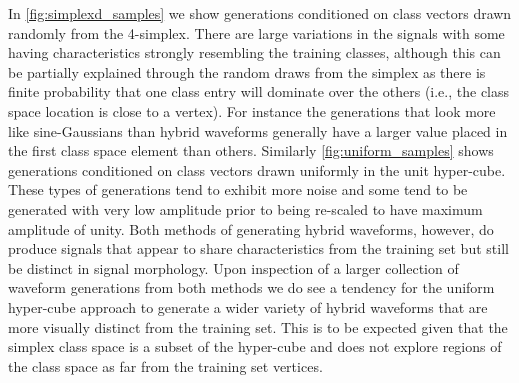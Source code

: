 \documentclass[12pt]{iopart}
\newcommand{\chris}[1]{\textbf{\textcolor{green}{CHRIS: #1}}}
\newcommand{\michael}[1]{\textbf{\textcolor{orange}{MICHAEL: #1}}}
\begin{document}
In \cref{fig:simplexd_samples} we show generations conditioned on class vectors drawn randomly from the 4-simplex. There are large variations in the signals with some having characteristics strongly resembling the training classes, although this can be partially explained through the random draws from the simplex as there is finite probability that one class entry will dominate over the others (i.e., the class space location is close to a vertex). For instance the generations that look more like sine-Gaussians than hybrid waveforms generally have a larger value placed in the first class space element than others. Similarly \cref{fig:uniform_samples} shows generations conditioned on class vectors drawn uniformly in the unit hyper-cube. These types of generations tend to exhibit more noise and some tend to be generated with very low amplitude prior to being re-scaled to have maximum amplitude of unity. Both methods of generating hybrid waveforms, however, do produce signals that appear to share characteristics from the training set but still be distinct in signal morphology. Upon inspection of a larger collection of waveform generations from both methods we do see a tendency for the uniform hyper-cube approach to generate a wider variety of hybrid waveforms that are more visually distinct from the training set. This is to be expected given that the simplex class space is a subset of the hyper-cube and does not explore regions of the class space as far from the training set vertices.

\end{document}
